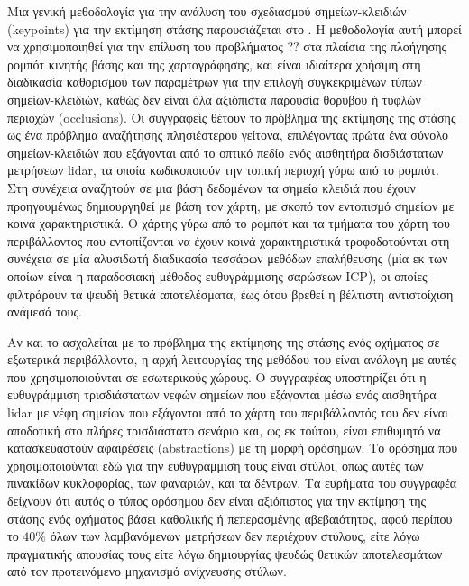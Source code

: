 Μια γενική μεθοδολογία για την ανάλυση του σχεδιασμού σημείων-κλειδιών
(keypoints) για την εκτίμηση στάσης παρουσιάζεται στο \cite{Bosse2009}. Η
μεθοδολογία αυτή μπορεί να χρησιμοποιηθεί για την επίλυση του προβλήματος ??
στα πλαίσια της πλοήγησης ρομπότ κινητής βάσης και της χαρτογράφησης, και είναι
ιδιαίτερα χρήσιμη στη διαδικασία καθορισμού των παραμέτρων για την επιλογή
συγκεκριμένων τύπων σημείων-κλειδιών, καθώς δεν είναι όλα αξιόπιστα παρουσία
θορύβου ή τυφλών περιοχών (occlusions). Οι συγγραφείς θέτουν το πρόβλημα της
εκτίμησης της στάσης ως ένα πρόβλημα αναζήτησης πλησιέστερου γείτονα,
επιλέγοντας πρώτα ένα σύνολο σημείων-κλειδιών που εξάγονται από το οπτικό πεδίο
ενός αισθητήρα δισδιάστατων μετρήσεων lidar, τα οποία κωδικοποιούν την τοπική περιοχή
γύρω από το ρομπότ. Στη συνέχεια αναζητούν σε μια βάση δεδομένων τα σημεία
κλειδιά που έχουν προηγουμένως δημιουργηθεί με βάση τον χάρτη, με σκοπό τον
εντοπισμό σημείων με κοινά χαρακτηριστικά. Ο χάρτης γύρω από το ρομπότ και τα
τμήματα του χάρτη του περιβάλλοντος που εντοπίζονται να έχουν κοινά
χαρακτηριστικά τροφοδοτούνται στη συνέχεια σε μία αλυσιδωτή διαδικασία τεσσάρων
μεθόδων επαλήθευσης (μία εκ των οποίων είναι η παραδοσιακή μέθοδος
ευθυγράμμισης σαρώσεων ICP), οι οποίες φιλτράρουν τα ψευδή θετικά αποτελέσματα,
έως ότου βρεθεί η βέλτιστη αντιστοίχιση ανάμεσά τους.

Αν και το \cite{Brenner2010} ασχολείται με το πρόβλημα της εκτίμησης της στάσης
ενός οχήματος σε εξωτερικά περιβάλλοντα, η αρχή λειτουργίας της μεθόδου του
είναι ανάλογη με αυτές που χρησιμοποιούνται σε εσωτερικούς χώρους.  Ο
συγγραφέας υποστηρίζει ότι η ευθυγράμμιση τρισδιάστατων νεφών σημείων που
εξάγονται μέσω ενός αισθητήρα lidar με νέφη σημείων που εξάγονται από το χάρτη
του περιβάλλοντός του δεν είναι αποδοτική στο πλήρες τρισδιάστατο σενάριο και,
ως εκ τούτου, είναι επιθυμητό να κατασκευαστούν αφαιρέσεις (abstractions) με τη
μορφή ορόσημων. Το ορόσημα που χρησιμοποιούνται εδώ για την ευθυγράμμιση τους
είναι στύλοι, όπως αυτές των πινακίδων κυκλοφορίας, των φαναριών, και τα
δέντρων. Τα ευρήματα του συγγραφέα δείχνουν ότι αυτός ο τύπος ορόσημου δεν
είναι αξιόπιστος για την εκτίμηση της στάσης ενός οχήματος βάσει καθολικής ή
πεπερασμένης αβεβαιότητος, αφού περίπου το $40\%$ όλων των λαμβανόμενων
μετρήσεων δεν περιέχουν στύλους, είτε λόγω πραγματικής απουσίας τους είτε
λόγω δημιουργίας ψευδώς θετικών αποτελεσμάτων από τον προτεινόμενο μηχανισμό
ανίχνευσης στύλων.

